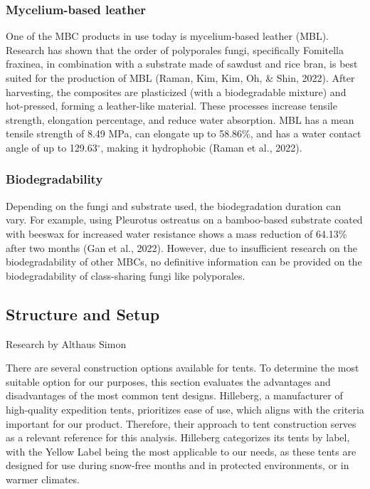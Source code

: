 \documentclass{article}
\begin{document}

\subsubsection{Mycelium-based leather}

One of the MBC products in use today is mycelium-based leather (MBL).
Research has shown that the order of polyporales fungi, specifically
Fomitella fraxinea, in combination with a substrate made of sawdust
and rice bran, is best suited for the production of MBL
(Raman, Kim, Kim, Oh, \& Shin, 2022). After harvesting, the
composites are plasticized (with a biodegradable mixture) and
hot-pressed, forming a leather-like material. These processes
increase tensile strength, elongation percentage, and reduce water
absorption. MBL has a mean tensile strength of 8.49 MPa, can elongate
up to 58.86\%, and has a water contact angle of up to 129.63$^{\circ}$,
making it hydrophobic (Raman et al., 2022).\\


\subsubsection{Biodegradability}

Depending on the fungi and substrate used, the biodegradation
duration can vary. For example, using Pleurotus ostreatus on a
bamboo-based substrate coated with beeswax for increased water
resistance shows a mass reduction of 64.13\% after two months
(Gan et al., 2022). However, due to insufficient research on the
biodegradability of other MBCs, no definitive information can be
provided on the biodegradability of class-sharing fungi like
polyporales.\\


\subsection{Structure and Setup}
{\small Research by Althaus Simon}

There are several construction options available for tents. To determine the most suitable
option for our purposes, this section evaluates the advantages and disadvantages of the
most common tent designs. Hilleberg, a manufacturer of high-quality expedition tents,
prioritizes ease of use, which aligns with the criteria important for our product.
Therefore, their approach to tent construction serves as a relevant reference for this
analysis. Hilleberg categorizes its tents by label, with the Yellow Label being the most
applicable to our needs, as these tents are designed for use during snow-free months and
in protected environments, or in warmer climates.
\end{document}
